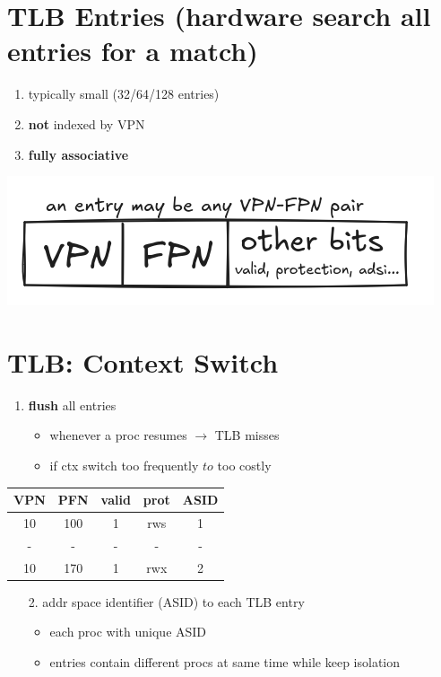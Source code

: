 \section*{TLB Entries (hardware search all entries for a match)}
\begin{minipage}{.45\linewidth}
  \flushleft
  \begin{enumerate}
  \item typically small (32/64/128 entries)
  \item \textbf{not} indexed by VPN
  \item \textbf{fully associative}
  \end{enumerate}
\end{minipage}
\begin{minipage}{.55\linewidth}
  \includegraphics[width=\linewidth]{imgs/tlb_entry}
\end{minipage}
\section*{TLB: Context Switch}
\begin{minipage}{.45\linewidth}
  \flushleft
  \begin{enumerate}
  \item \textbf{flush} all entries
    \begin{itemize}
    \item whenever a proc resumes $\to$ TLB misses
    \item if ctx switch too frequently $to$ too costly
    \end{itemize}
  \end{enumerate}
\end{minipage}
\begin{minipage}{.55\linewidth}
  \begin{tabular}{ccccc}
    VPN & PFN & valid & prot & ASID \\
    \hline
    10 & 100  &   1   & rws  & 1    \\
    -  &  -   &   -   & -    & -    \\
    10 & 170  &   1   & rwx  & 2    \\
    \hline
  \end{tabular}
\end{minipage}
\begin{enumerate}
\item[2.] addr space identifier (ASID) to each TLB entry
  \begin{itemize}
  \item each proc with unique ASID
  \item entries contain different procs at same time while keep isolation
  \end{itemize}
\end{enumerate}
